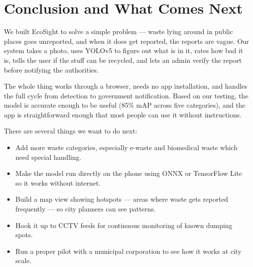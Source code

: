\documentclass[conference]{IEEEtran}
\begin{document}
\section{Conclusion and What Comes Next}

We built EcoSight to solve a simple problem — waste lying around in public places goes unreported, and when it does get reported, the reports are vague. Our system takes a photo, uses YOLOv5 to figure out what is in it, rates how bad it is, tells the user if the stuff can be recycled, and lets an admin verify the report before notifying the authorities.

The whole thing works through a browser, needs no app installation, and handles the full cycle from detection to government notification. Based on our testing, the model is accurate enough to be useful (85\% mAP across five categories), and the app is straightforward enough that most people can use it without instructions.

There are several things we want to do next:

\begin{itemize}[leftmargin=*]
    \item Add more waste categories, especially e-waste and biomedical waste which need special handling.
    \item Make the model run directly on the phone using ONNX or TensorFlow Lite so it works without internet.
    \item Build a map view showing hotspots — areas where waste gets reported frequently — so city planners can see patterns.
    \item Hook it up to CCTV feeds for continuous monitoring of known dumping spots.
    \item Run a proper pilot with a municipal corporation to see how it works at city scale.
\end{itemize}
\end{document}
